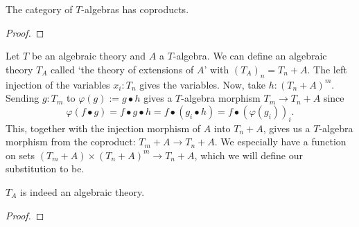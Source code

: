 \begin{lemma}
  The category of $ T $-algebras has coproducts.
\end{lemma}
\begin{proof}
  \TODO
\end{proof}

\begin{definition}
  Let $ T $ be an algebraic theory and $ A $ a $ T $-algebra. We can define an algebraic theory $ T_A $ called `the theory of extensions of $ A $' with $ (T_A)_n = T_n + A $. The left injection of the variables $ x_i : T_n $ gives the variables.
  Now, take $ h: (T_n + A)^m $. Sending $ g: T_m $ to $ \varphi(g) := g \bullet h $ gives a $ T $-algebra morphism $ T_m \to T_n + A $ since
  \[ \varphi(f \bullet g) = f \bullet g \bullet h = f \bullet (g_i \bullet h) = f \bullet (\varphi(g_i))_i. \]
  This, together with the injection morphism of $ A $ into $ T_n + A $, gives us a $ T $-algebra morphism from the coproduct: $ T_m + A \to T_n + A $. We especially have a function on sets $ (T_m + A) \times (T_n + A)^m \to T_n + A $, which we will define our substitution to be.
\end{definition}

\begin{lemma}
  $ T_A $ is indeed an algebraic theory.
\end{lemma}
\begin{proof}
  \TODO
\end{proof}
